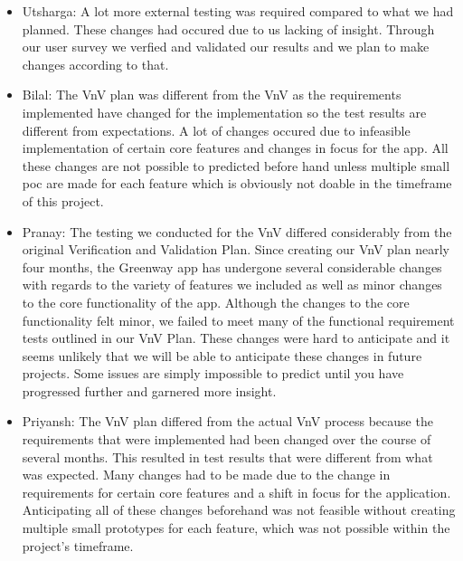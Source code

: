 \documentclass[12pt, titlepage]{article}
\begin{document}
\begin{itemize}
\item Utsharga: A lot more external testing was required compared to what we had planned. These changes had occured due to us lacking of insight. Through our user survey we verfied and validated our results and we plan to make changes according to that.
\item Bilal: The VnV plan was different from the VnV as the requirements implemented have changed for the implementation so the test results are 
different from expectations. A lot of changes occured due to infeasible implementation of certain core features and changes in focus for the app. 
All these changes are not possible to predicted before hand unless multiple small poc are made for each feature which is obviously not doable in 
the timeframe of this project.
\item Pranay: The testing we conducted for the VnV differed considerably from the original Verification and Validation Plan. Since creating our VnV plan nearly four months, the Greenway app has undergone several considerable changes with regards to the variety of features we included as well as minor changes to the core functionality of the app. Although the changes to the core functionality felt minor, we failed to meet many of the functional requirement tests outlined in our VnV Plan. These changes were hard to anticipate and it seems unlikely that we will be able to anticipate these changes in future projects. Some issues are simply impossible to predict until you have progressed further and garnered more insight. 
\item Priyansh: The VnV plan differed from the actual VnV process because the requirements that were implemented had been changed over the course of several months. This resulted in test results that were different from what was expected. Many changes had to be made due to the change in requirements for certain core features and a shift in focus for the application. Anticipating all of these changes beforehand was not feasible without creating multiple small prototypes for each feature, which was not possible within the project's timeframe.
\end{itemize}
\end{document}
